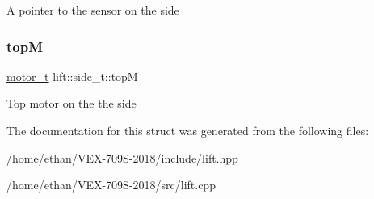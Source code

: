 A pointer to the sensor on the side \mbox{\label{structlift_1_1side__t_a98eccfefb378ed0a246a5f74a95f9020}} 
\subsubsection{\texorpdfstring{topM}{topM}}
{\footnotesize\ttfamily \hyperlink{structmotor__t}{motor\+\_\+t} lift\+::side\+\_\+t\+::topM}

Top motor on the the side 

The documentation for this struct was generated from the following files\+:\begin{DoxyCompactItemize}
\item 
/home/ethan/\+V\+E\+X-\/709\+S-\/2018/include/lift.\+hpp\item 
/home/ethan/\+V\+E\+X-\/709\+S-\/2018/src/lift.\+cpp\end{DoxyCompactItemize}
